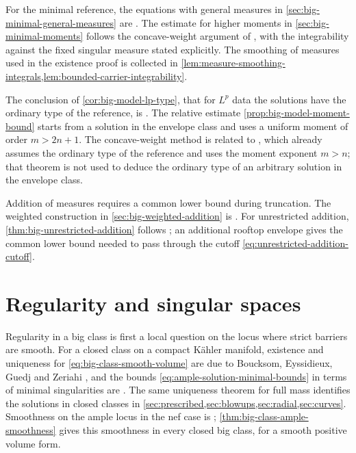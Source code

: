 For the minimal reference, the equations with general measures in \cref{sec:big-minimal-general-measures} are \cite[v1, Theorems 5.2--5.3]{XL26}. The estimate for higher moments in \cref{sec:big-minimal-moments} follows the concave-weight argument of \cite[v1, Proposition 5.1 and Lemma 5.1]{XL26}, with the integrability against the fixed singular measure stated explicitly. The smoothing of measures used in the existence proof is collected in \cref{lem:measure-smoothing-integrals,lem:bounded-carrier-integrability}.

The conclusion of \cref{cor:big-model-lp-type}, that for $L^p$ data the solutions have the ordinary type of the reference, is \cite[v1, Corollary 6.1]{XL26}. The relative estimate \cref{prop:big-model-moment-bound} starts from a solution in the envelope class and uses a uniform moment of order $m>2n+1$. The concave-weight method is related to \cite[v1, Theorem 5.1]{XL26}, which already assumes the ordinary type of the reference and uses the moment exponent $m>n$; that theorem is not used to deduce the ordinary type of an arbitrary solution in the envelope class.

Addition of measures requires a common lower bound during truncation. The weighted construction in \cref{sec:big-weighted-addition} is \cite[v1, Proposition 6.1]{XL26}. For unrestricted addition, \cref{thm:big-unrestricted-addition} follows \cite[v1, Theorem 6.3]{XL26}; an additional rooftop envelope gives the common lower bound needed to pass through the cutoff \eqref{eq:unrestricted-addition-cutoff}.

\section{Regularity and singular spaces}
\label{sec:history-regularity}

Regularity in a big class is first a local question on the locus where strict barriers are smooth. For a closed class on a compact K\"ahler manifold, existence and uniqueness for \eqref{eq:big-class-smooth-volume} are due to Boucksom, Eyssidieux, Guedj and Zeriahi \cite[Theorem~A, p.~200, equivalently Theorem~3.1, p.~236]{BEGZ10}, and the bounds \eqref{eq:ample-solution-minimal-bounds} in terms of minimal singularities are \cite[Theorem~B, p.~201, quantitatively Theorem~4.1, p.~245]{BEGZ10}. The same uniqueness theorem for full mass identifies the solutions in closed classes in \cref{sec:prescribed,sec:blowups,sec:radial,sec:curves}. Smoothness on the ample locus in the nef case is \cite[Theorem~C, p.~201]{BEGZ10}; \cref{thm:big-class-ample-smoothness} gives this smoothness in every closed big class, for a smooth positive volume form.

